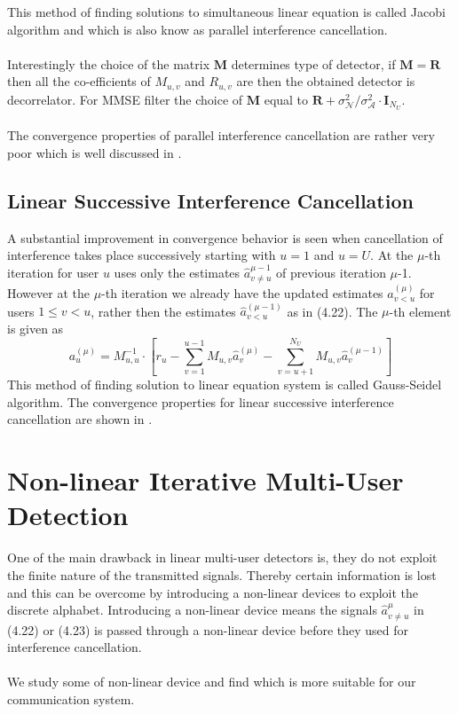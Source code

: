 This method of finding solutions to simultaneous linear equation is called Jacobi algorithm and which is also know as parallel interference cancellation.\\ \\
Interestingly the choice of the matrix $\mathrm{\mathbf{M}}$ determines type of detector, if $\mathrm{\mathbf{M}}=\mathrm{\mathbf{R}}$ then all the co-efficients of $M_{u,v}$ and $R_{u,v}$ are then the obtained detector is decorrelator. For MMSE filter the choice of $\mathrm{\mathbf{M}}$ equal to $\mathrm{\mathbf{R}}+\sigma_{\mathcal{N}}^{2}/\sigma_{\mathcal{A}}^{2}\cdot\mathrm{\mathbf{I}}_{N_U}$. \\ \\
The convergence properties of parallel interference cancellation are rather very poor which is well discussed in \cite{K05}.
\subsection{Linear Successive Interference Cancellation}
A substantial improvement in convergence behavior is seen when cancellation of interference takes place successively starting with $u=1$ and $u=U$. At the $\mu$-th iteration for user $u$ uses only the estimates $\hat{a}_{v\ne u}^{\mu-1}$ of previous iteration $\mu$-1. However at the $\mu$-th iteration we already have the updated estimates $\hat{a}_{v<u}^{(\mu)}$ for users $1\leq v < u$, rather then the estimates $\hat{a}_{v<u}^{(\mu-1)}$ as in (4.22).  The $\mu$-th element is given as 
\begin{equation}
a_u^{(\mu)}=M_{u,u}^{-1}\cdot \left[r_u-\sum\limits_{v=1}^{u-1}M_{u,v}\hat{a}_v^{(\mu)}-\sum\limits_{v=u+1}^{N_U}M_{u,v}\hat{a}_v^{(\mu-1)}\right]
\end{equation}
This method of finding solution to linear equation system is called Gauss-Seidel algorithm. The convergence properties for linear successive interference cancellation are shown in \cite{K05}.
\section{Non-linear Iterative Multi-User Detection}
One of the main drawback in linear multi-user detectors is, they do not exploit the finite nature of the transmitted signals. Thereby certain information is lost and this can be overcome by introducing a non-linear devices to exploit the discrete alphabet. Introducing a non-linear device means the signals $\hat{a}_{v\ne u}^{\mu}$ in (4.22) or (4.23) is passed through a non-linear device before they used for interference cancellation. \\ \\
We study some of non-linear device and find which is more suitable for our communication system.
